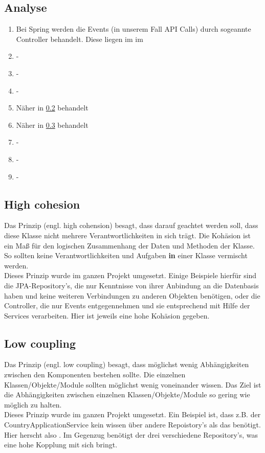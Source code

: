 	\newpage
		
		\subsection{Analyse}
		\begin{enumerate}
			\item Bei Spring werden die Events (in unserem Fall API Calls) durch sogeannte Controller behandelt. Diese liegen im  im 
			\item -
			\item -
			\item -
			\item Näher in \cref{3.highCohesion} behandelt
			\item Näher in \cref{3.lowCoupling} behandelt
			\item -
			\item -
			\item -
 		\end{enumerate}
	
			\subsection{High cohesion \cite{kohaesion.google}} \label{3.highCohesion}
			Das Prinzip  (engl. high cohension) besagt, dass darauf geachtet werden soll, dass diese Klasse nicht mehrere Verantwortlichkeiten in sich trägt. Die Kohäsion ist ein Maß für den logischen Zusammenhang der Daten und Methoden der Klasse. So sollten keine Verantwortlichkeiten und Aufgaben \textbf{in} einer Klasse vermischt werden. \\
			Dieses Prinzip wurde im ganzen Projekt umgesetzt. Einige Beispiele hierfür sind die JPA-Repository's, die nur Kenntnisse von ihrer Anbindung an die Datenbasis haben und keine weiteren Verbindungen zu anderen Objekten benötigen, oder die Controller, die nur Events entgegennehmen und sie entsprechend mit Hilfe der Services verarbeiten. Hier ist jeweils eine hohe Kohäsion gegeben.
			
			\subsection{Low coupling \cite{kohaesion.google}} \label{3.lowCoupling}
			Das Prinzip  (engl. low coupling) besagt, dass möglichst wenig Abhängigkeiten zwischen den Komponenten bestehen sollte. Die einzelnen Klassen/Objekte/Module sollten möglichst wenig voneinander wissen. Das Ziel ist die Abhängigkeiten zwischen einzelnen Klassen/Objekte/Module so gering wie möglich zu halten. \\
			Dieses Prinzip wurde im ganzen Projekt umgesetzt. Ein Beispiel ist, dass z.B. der CountryApplicationService kein wissen über andere Repoistory's als das  benötigt. Hier herscht also . Im Gegenzug benötigt der  drei verschiedene Repository's, was eine hohe Kopplung mit sich bringt.
			
